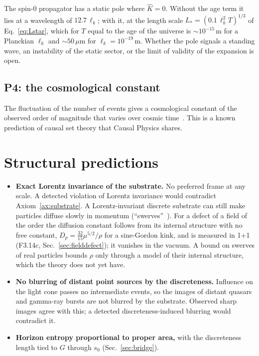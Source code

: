 The spin-0 propagator has a static pole where $\hat K=0$. Without the age term it lies at a wavelength
of $12.7\,\ell_k$; with it, at the length scale $L_*=(0.1\,\ell_k^2T)^{1/3}$ of Eq.~\eqref{eq:Lstar}, which for
$T$ equal to the age of the universe is $\sim10^{-15}$\,m for a Planckian $\ell_k$ and $\sim50\,\mu$m for
$\ell_k=10^{-19}$\,m. Whether the pole signals a standing wave, an
instability of the static sector, or the limit of validity of the expansion is open. 

\subsection{P4: the cosmological constant}

The fluctuation of the number of events gives a cosmological constant of the observed order of magnitude
that varies over cosmic time~\cite{Ahmed2004}. This is a known prediction of causal set theory that
Causal Physics shares. 

\section{Structural predictions}\label{sec:structural}

\begin{itemize}
\item \textbf{Exact Lorentz invariance of the substrate.} No preferred frame at any scale. A detected
  violation of Lorentz invariance would contradict Axiom~\ref{ax:substrate}. A Lorentz-invariant discrete
  substrate can still make particles diffuse slowly in momentum (``swerves''~\cite{DowkerHensonSorkin2004}).
  For a defect of a field of the order the diffusion constant follows from its internal structure with no free
  constant, $D_p=\tfrac{32}{15}\mu^{5/2}/\rho$ for a sine-Gordon kink, and is measured in 1+1 (F3.14c,
  Sec.~\ref{sec:fielddefect}); it vanishes in the vacuum. A bound on swerves of real particles bounds $\rho$ only
  through a model of their internal structure, which the theory does not yet have. 
\item \textbf{No blurring of distant point sources by the discreteness.} Influence on the light cone
  passes no intermediate events, so the images of distant quasars and gamma-ray bursts are not blurred
  by the substrate. Observed sharp images agree with this; a detected discreteness-induced blurring would
  contradict it.
\item \textbf{Horizon entropy proportional to proper area,} with the discreteness length tied to $G$
  through $s_0$ (Sec.~\ref{sec:bridge}).
\end{itemize}

